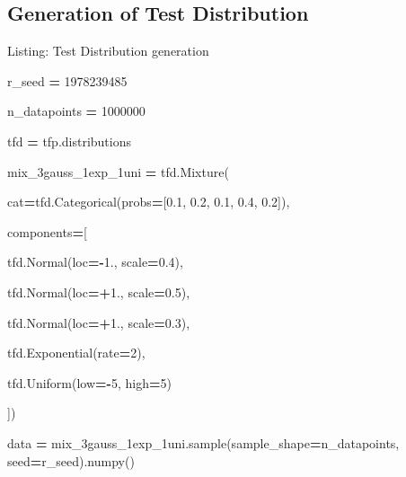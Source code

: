 \documentclass[
  12pt,
  english,
  a4paper,
,tablecaptionabove
]{scrartcl}
\newenvironment{Shaded}{\begin{snugshade}}{\end{snugshade}}
\newcommand{\DecValTok}[1]{\textcolor[rgb]{0.00,0.00,0.81}{#1}}
\newcommand{\FloatTok}[1]{\textcolor[rgb]{0.00,0.00,0.81}{#1}}
\newcommand{\NormalTok}[1]{#1}
\newcommand{\OperatorTok}[1]{\textcolor[rgb]{0.81,0.36,0.00}{\textbf{#1}}}
\begin{document}
\hypertarget{generation-of-test-distribution}{%
\subsection{Generation of Test Distribution}\label{generation-of-test-distribution}}

Listing: Test Distribution generation

\begin{Shaded}
\begin{Highlighting}[]
\NormalTok{r_seed }\OperatorTok{=} \DecValTok{1978239485}

\NormalTok{n_datapoints }\OperatorTok{=} \DecValTok{1000000}



\NormalTok{tfd }\OperatorTok{=}\NormalTok{ tfp.distributions}

\NormalTok{mix_3gauss_1exp_1uni }\OperatorTok{=}\NormalTok{ tfd.Mixture(}

\NormalTok{  cat}\OperatorTok{=}\NormalTok{tfd.Categorical(probs}\OperatorTok{=}\NormalTok{[}\FloatTok{0.1}\NormalTok{, }\FloatTok{0.2}\NormalTok{, }\FloatTok{0.1}\NormalTok{, }\FloatTok{0.4}\NormalTok{, }\FloatTok{0.2}\NormalTok{]),}

\NormalTok{  components}\OperatorTok{=}\NormalTok{[}

\NormalTok{    tfd.Normal(loc}\OperatorTok{=-}\FloatTok{1.}\NormalTok{, scale}\OperatorTok{=}\FloatTok{0.4}\NormalTok{),}

\NormalTok{    tfd.Normal(loc}\OperatorTok{=+}\FloatTok{1.}\NormalTok{, scale}\OperatorTok{=}\FloatTok{0.5}\NormalTok{),}

\NormalTok{    tfd.Normal(loc}\OperatorTok{=+}\FloatTok{1.}\NormalTok{, scale}\OperatorTok{=}\FloatTok{0.3}\NormalTok{),}

\NormalTok{    tfd.Exponential(rate}\OperatorTok{=}\DecValTok{2}\NormalTok{),}

\NormalTok{    tfd.Uniform(low}\OperatorTok{=-}\DecValTok{5}\NormalTok{, high}\OperatorTok{=}\DecValTok{5}\NormalTok{)}

\NormalTok{])}



\NormalTok{data }\OperatorTok{=}\NormalTok{ mix_3gauss_1exp_1uni.sample(sample_shape}\OperatorTok{=}\NormalTok{n_datapoints, seed}\OperatorTok{=}\NormalTok{r_seed).numpy()}
\end{Highlighting}
\end{Shaded}
\end{document}
